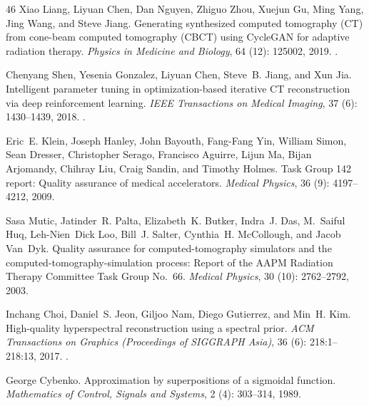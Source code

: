 \documentclass[11pt]{article}
\begin{document}
\begin{thebibliography}{46}
Xiao Liang, Liyuan Chen, Dan Nguyen, Zhiguo Zhou, Xuejun Gu, Ming Yang, Jing
  Wang, and Steve Jiang.
\newblock Generating synthesized computed tomography ({CT}) from cone-beam
  computed tomography ({CBCT}) using {CycleGAN} for adaptive radiation therapy.
\newblock \emph{Physics in Medicine and Biology}, 64 (12):
  125002, 2019.
\newblock {}.

Chenyang Shen, Yesenia Gonzalez, Liyuan Chen, Steve~B. Jiang, and Xun Jia.
\newblock Intelligent parameter tuning in optimization-based iterative {CT}
  reconstruction via deep reinforcement learning.
\newblock \emph{IEEE Transactions on Medical Imaging}, 37
  (6): 1430--1439, 2018.
\newblock {}.

Eric~E. Klein, Joseph Hanley, John Bayouth, Fang-Fang Yin, William Simon, Sean
  Dresser, Christopher Serago, Francisco Aguirre, Lijun Ma, Bijan Arjomandy,
  Chihray Liu, Craig Sandin, and Timothy Holmes.
\newblock Task {G}roup 142 report: Quality assurance of medical accelerators.
\newblock \emph{Medical Physics}, 36 (9): 4197--4212, 2009.

Sasa Mutic, Jatinder~R. Palta, Elizabeth~K. Butker, Indra~J. Das, M.~Saiful
  Huq, Leh-Nien~Dick Loo, Bill~J. Salter, Cynthia~H. McCollough, and Jacob
  Van~Dyk.
\newblock Quality assurance for computed-tomography simulators and the
  computed-tomography-simulation process: Report of the {AAPM} {R}adiation
  {T}herapy {C}ommittee {T}ask {G}roup {N}o.\ 66.
\newblock \emph{Medical Physics}, 30 (10): 2762--2792, 2003.

Inchang Choi, Daniel~S. Jeon, Giljoo Nam, Diego Gutierrez, and Min~H. Kim.
\newblock High-quality hyperspectral reconstruction using a spectral prior.
\newblock \emph{ACM Transactions on Graphics (Proceedings of SIGGRAPH Asia)},
  36 (6): 218:1--218:13, 2017.
\newblock {}.

George Cybenko.
\newblock Approximation by superpositions of a sigmoidal function.
\newblock \emph{Mathematics of Control, Signals and Systems}, 2
  (4): 303--314, 1989.


\end{thebibliography}
\end{document}

